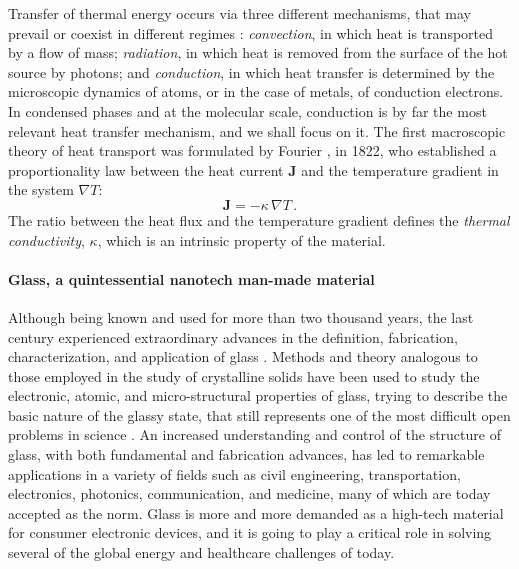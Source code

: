 Transfer of thermal energy occurs via three different mechanisms, that may prevail or coexist in different regimes \cite{Lienhard2017}: \emph{convection}, in which heat is transported by a flow of mass; \emph{radiation}, in which heat is removed from the surface of the hot source by photons; and \emph{conduction}, in which heat transfer is determined by the microscopic dynamics of atoms, or in the case of metals, of conduction electrons. 
In condensed phases and at the molecular scale, conduction is by far the most relevant heat transfer mechanism, and we shall focus on it. 
The first macroscopic theory of heat transport was formulated by Fourier \cite{Fourier1878}, in 1822, who established a proportionality law between the heat current $\mathbf{J}$ and the temperature gradient in the system $\nabla T$:
\begin{equation}
    \mathbf{J} = -\kappa\, \nabla T \,.  \label{eq:Fourier-law}
\end{equation}
The ratio between the heat flux and the temperature gradient defines the \emph{thermal conductivity}, $\kappa$, which is an intrinsic property of the material. 

\medskip

\paragraph{Glass, a quintessential nanotech man-made material}
Although being known and used for more than two thousand years, the last century experienced extraordinary advances in the definition, fabrication, characterization, and application of glass \cite{Mauro2014}. 
Methods and theory analogous to those employed in the study of crystalline solids have been used to study the electronic, atomic, and micro-structural properties of glass, trying to describe the basic nature of the glassy state, that still represents one of the most difficult open problems in science \cite{MauroFM14}. 
An increased understanding and control of the structure of glass, with both fundamental and fabrication advances, has led to remarkable applications in a variety of fields such as civil engineering, transportation, electronics, photonics, communication, and medicine, many of which are today accepted as the norm. 
Glass is more and more demanded as a high-tech material for consumer electronic devices, and it is going to play a critical role in solving several of the global energy and healthcare challenges of today. 

